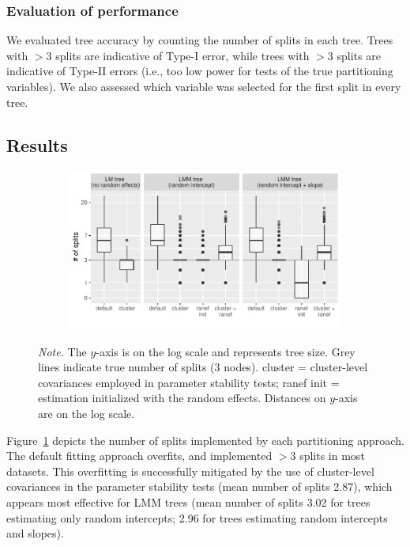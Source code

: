 \documentclass[doc,floatsintext,natbib]{apa7}
\begin{document}
\subsubsection{Evaluation of performance}

We evaluated tree accuracy by counting the number of splits in each tree. Trees with $> 3$ splits are indicative of Type-I error, while trees with $> 3$ splits are indicative of Type-II errors (i.e., too low power for tests of the true partitioning variables). We also assessed which variable was selected for the first split in every tree. 


\subsection{Results}









\begin{figure}[!ht]
\caption{Tree size distributions for LM(M) trees.}
\begin{subfigure}{1.2\textwidth}
\includegraphics{_Partitioning_GCMs_with_GLMM_trees-009}
\end{subfigure}
{\footnotesize \textit{Note.} The $y$-axis is on the log scale and represents tree size. Grey lines indicate true number of splits (3 nodes). cluster = cluster-level covariances employed in parameter stability tests; ranef init = estimation initialized with the random effects. Distances on $y$-axis are on the log scale.}
\label{fig:LMM_sizes}
\end{figure}

Figure~\ref{fig:LMM_sizes} depicts the number of splits implemented by each partitioning approach. The default fitting approach overfits, and implemented $> 3$ splits in most datasets. This overfitting is successfully mitigated by the use of cluster-level covariances in the parameter stability tests (mean number of splits 2.87), which appears most effective for LMM trees (mean number of splits 3.02 for trees estimating only random intercepts; 2.96 for trees estimating random intercepts and slopes). 
\end{document}

